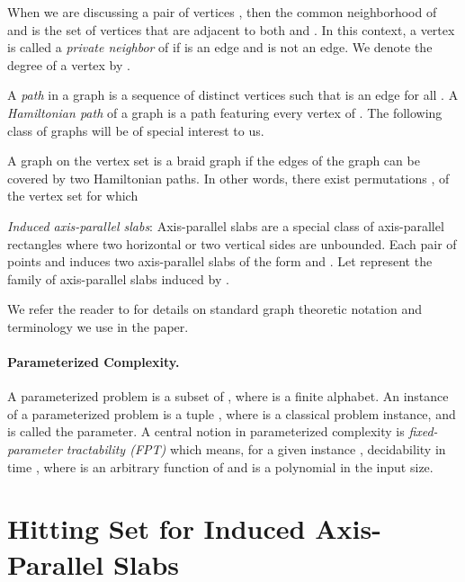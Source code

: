 \documentclass[svgnames]{llncs}
\newcommand{\braid}{braid}
\newcommand{\Braid}{Braid}
\begin{document}
When we are discussing a pair of vertices , then the common neighborhood of  and  is the set of vertices that are adjacent to both  and . 
In this context, a vertex  is called a \emph{private neighbor} of  if  is an edge and  is not an edge. We denote the degree of a vertex  by .

A \emph{path} in a graph is a sequence of distinct vertices  such that  is an edge for all .
A \emph{Hamiltonian path} of a graph  is a path featuring every vertex of . The following class of graphs will be of special interest to us.

\begin{definition}[\Braid{} graphs]
A graph  on the vertex set  is a \braid{} graph if the edges of the graph can be covered by two Hamiltonian paths. In other words, there exist permutations ,  of the vertex set for 
which  
\end{definition}



{\em Induced axis-parallel slabs}: Axis-parallel slabs are a special class
of axis-parallel rectangles where two horizontal or two vertical sides are
unbounded. Each pair of points  and  induces two
axis-parallel slabs of the form  and
. Let  represent the
family of  axis-parallel slabs induced by .





We refer the reader to \cite{graphbook} for details on standard graph theoretic notation and terminology we use in the paper. 

\paragraph{Parameterized Complexity.} A parameterized problem  is a subset of , where  is a finite alphabet. An instance of a
parameterized problem is a tuple , where  is a classical problem instance, 
and  is called the parameter. A central notion in parameterized complexity is {\em
  fixed-parameter tractability (FPT)} which means, for a given
instance , decidability in time , where
 is an arbitrary function of  and  is a polynomial in the
input size. 



 



\section{Hitting Set for Induced Axis-Parallel Slabs}
\end{document}
